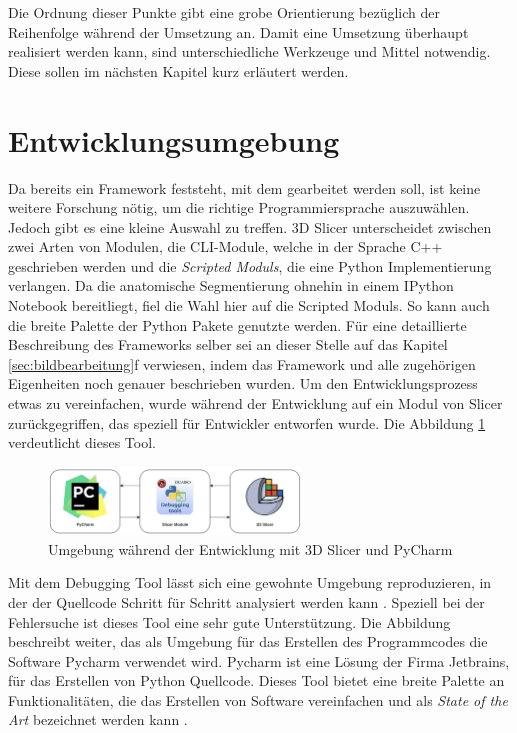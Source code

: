 Die Ordnung dieser Punkte gibt eine grobe Orientierung bezüglich der Reihenfolge
während der Umsetzung an. Damit eine Umsetzung überhaupt realisiert werden kann,
sind unterschiedliche Werkzeuge und Mittel notwendig. Diese sollen im nächsten Kapitel
kurz erläutert werden.

\section{Entwicklungsumgebung}
Da bereits ein Framework feststeht, mit dem gearbeitet werden soll, ist keine weitere
Forschung nötig, um die richtige Programmiersprache auszuwählen. Jedoch gibt es eine
kleine Auswahl zu treffen. 3D Slicer unterscheidet zwischen zwei Arten von
Modulen, die \ac{CLI}-Module, welche in der Sprache C++ geschrieben werden und die
\textit{Scripted Moduls}, die eine Python Implementierung verlangen. Da die
anatomische Segmentierung ohnehin in einem IPython Notebook bereitliegt, fiel die
Wahl hier auf die Scripted Moduls. So kann auch die breite Palette der Python
Pakete genutzte werden. Für eine detaillierte Beschreibung des Frameworks selber
sei an dieser Stelle auf das Kapitel \ref{sec:bildbearbeitung}f verwiesen, indem
das Framework und alle zugehörigen Eigenheiten noch genauer beschrieben wurden.
Um den Entwicklungsprozess etwas zu vereinfachen, wurde während der Entwicklung auf
ein Modul von Slicer zurückgegriffen, das speziell für Entwickler entworfen
wurde. Die Abbildung \ref{fig:entwicklungsumgebung} verdeutlicht dieses Tool.

\begin{figure}[h]
	\centering
	\includegraphics[width=0.6\textwidth]{img/Entwicklungsumgebung.png}
	\caption{Umgebung während der Entwicklung mit 3D Slicer und PyCharm}
	\label{fig:entwicklungsumgebung}
\end{figure}

Mit dem Debugging Tool lässt sich eine gewohnte Umgebung reproduzieren, in der der
Quellcode Schritt für Schritt analysiert werden kann \citep[vgl.][]{slicerdebuggingtools}.
Speziell bei der Fehlersuche ist dieses Tool eine sehr gute Unterstützung. Die
Abbildung beschreibt weiter, das als Umgebung für das Erstellen des Programmcodes
die Software Pycharm verwendet wird. Pycharm ist eine Lösung der Firma Jetbrains,
für das Erstellen von Python Quellcode. Dieses Tool bietet eine breite Palette
an Funktionalitäten, die das Erstellen von Software vereinfachen und als \textit{State
of the Art} bezeichnet werden kann \citep[vgl.][]{jetbrains2024}.

